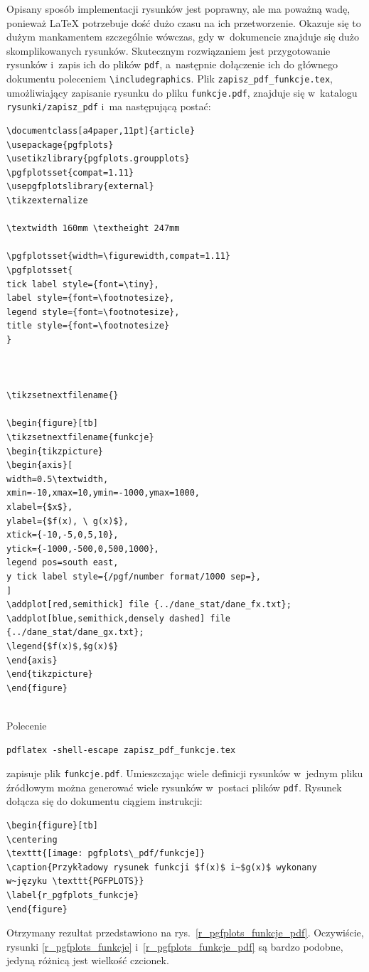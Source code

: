 Opisany sposób implementacji rysunków jest poprawny, ale ma poważną wadę, ponieważ \LaTeX{}   potrzebuje dość dużo czasu na ich przetworzenie. Okazuje się to dużym mankamentem szczególnie wówczas, gdy w~dokumencie znajduje się dużo skomplikowanych rysunków. Skutecznym rozwiązaniem jest przygotowanie rysunków i~zapis ich do plików \verb+pdf+, a~następnie dołączenie ich do głównego dokumentu poleceniem \verb+\includegraphics+. Plik \verb+zapisz_pdf_funkcje.tex+, umożliwiający zapisanie rysunku do pliku \verb+funkcje.pdf+, znajduje się w~katalogu \verb+rysunki/zapisz_pdf+ i~ma następującą postać:
\begin{lstlisting}[style=customlatex,frame=single]
\documentclass[a4paper,11pt]{article}
\usepackage{pgfplots}
\usetikzlibrary{pgfplots.groupplots}
\pgfplotsset{compat=1.11}
\usepgfplotslibrary{external}
\tikzexternalize

\textwidth 160mm \textheight 247mm

\pgfplotsset{width=\figurewidth,compat=1.11}
\pgfplotsset{
tick label style={font=\tiny},
label style={font=\footnotesize},
legend style={font=\footnotesize},
title style={font=\footnotesize}
}



\tikzsetnextfilename{}

\begin{figure}[tb]
\tikzsetnextfilename{funkcje}
\begin{tikzpicture}
\begin{axis}[
width=0.5\textwidth,
xmin=-10,xmax=10,ymin=-1000,ymax=1000,
xlabel={$x$},
ylabel={$f(x), \ g(x)$},
xtick={-10,-5,0,5,10},
ytick={-1000,-500,0,500,1000},
legend pos=south east,
y tick label style={/pgf/number format/1000 sep=},
]
\addplot[red,semithick] file {../dane_stat/dane_fx.txt};
\addplot[blue,semithick,densely dashed] file {../dane_stat/dane_gx.txt};
\legend{$f(x)$,$g(x)$}
\end{axis}
\end{tikzpicture}
\end{figure}


\end{lstlisting}
Polecenie
\begin{lstlisting}[style=customlatex,frame=single]
pdflatex -shell-escape zapisz_pdf_funkcje.tex
\end{lstlisting}
zapisuje plik \verb+funkcje.pdf+. Umieszczając wiele definicji rysunków w~jednym pliku źródłowym można  generować wiele rysunków w~postaci plików \verb+pdf+. Rysunek dołącza się do dokumentu ciągiem instrukcji:
\begin{lstlisting}[style=customlatex,frame=single]
\begin{figure}[tb]
\centering
\texttt{[image: pgfplots\_pdf/funkcje]}
\caption{Przykładowy rysunek funkcji $f(x)$ i~$g(x)$ wykonany
w~języku \texttt{PGFPLOTS}}
\label{r_pgfplots_funkcje}
\end{figure}
\end{lstlisting}
Otrzymany rezultat przedstawiono na rys.~\ref{r_pgfplots_funkcje_pdf}. Oczywiście, rysunki \ref{r_pgfplots_funkcje} i~\ref{r_pgfplots_funkcje_pdf} są bardzo podobne, jedyną różnicą jest wielkość czcionek.


